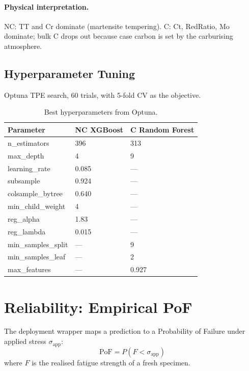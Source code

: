 \documentclass[10pt,a4paper]{article} %
\begin{document}
\paragraph{Physical interpretation.} NC: TT and Cr dominate (martensite tempering). C: Ct, RedRatio, Mo dominate; bulk C drops out because case carbon is set by the carburising atmosphere.

\subsection{Hyperparameter Tuning}
Optuna TPE search, 60 trials, with 5-fold CV as the objective.

\begin{table}[H]
\centering
\caption{Best hyperparameters from Optuna.}
\label{tab:hparams}
\begin{tabular}{lll}
\toprule
\textbf{Parameter} & \textbf{NC XGBoost} & \textbf{C Random Forest} \\
\midrule
n\_estimators       & 396                 & 313 \\
max\_depth          & 4                   & 9 \\
learning\_rate      & 0.085               & --- \\
subsample           & 0.924               & --- \\
colsample\_bytree   & 0.640               & --- \\
min\_child\_weight  & 4                   & --- \\
reg\_alpha          & 1.83                & --- \\
reg\_lambda         & 0.015               & --- \\
min\_samples\_split & ---                 & 9 \\
min\_samples\_leaf  & ---                 & 2 \\
max\_features       & ---                 & 0.927 \\
\bottomrule
\end{tabular}
\end{table}


\section{Reliability: Empirical PoF}\label{sec:reliability}

The deployment wrapper maps a prediction to a Probability of Failure under applied stress
$\sigma_{\text{app}}$:
\[
  \text{PoF} = P(F < \sigma_{\text{app}})
\]
where $F$ is the realised fatigue strength of a fresh specimen.
\end{document}
